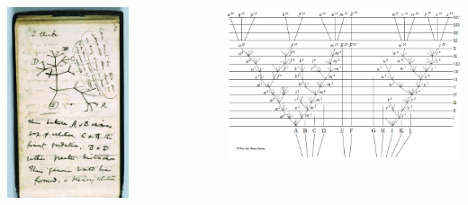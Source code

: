 \documentclass[10pt]{beamer}
\begin{document}
\begin{frame}
	\begin{columns}
		\begin{column}{0.5\textwidth}
			\begin{center}
				\includegraphics[width=0.6\textwidth]{figures/darwintree.jpg}
			\end{center}
		\end{column}
		
		\begin{column}{0.5\textwidth}
			\begin{center}
				\includegraphics[width=1.0\textwidth]{figures/darwintree2.jpg}
			\end{center}
		\end{column}
	\end{columns}
\end{frame}  
\end{document}
